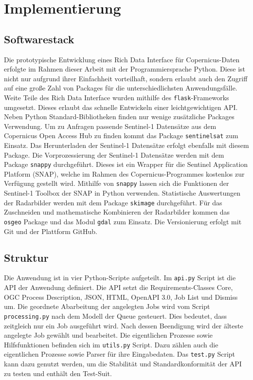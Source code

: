 \newpage
\restoregeometry
\section{Implementierung}
\subsection{Softwarestack}
Die prototypische Entwicklung eines Rich Data Interface für Copernicus-Daten erfolgte im Rahmen dieser Arbeit mit der Programmiersprache Python.
Diese ist nicht nur aufgrund ihrer Einfachheit vorteilhaft, sondern erlaubt auch den Zugriff auf eine große Zahl von Packages für die unterschiedlichsten 
Anwendungsfälle. Weite Teile des Rich Data Interface wurden mithilfe des \verb|flask|-Frameworks umgesetzt. Dieses erlaubt das schnelle Entwickeln einer leichtgewichtigen API.  
Neben Python Standard-Bibliotheken finden nur wenige zusätzliche Packages Verwendung. Um zu Anfragen passende Sentinel-1 Datensätze aus dem 
Copernicus Open Access Hub zu finden kommt das Package \verb|sentinelsat| zum Einsatz. Das Herunterladen der Sentinel-1 Datensätze erfolgt ebenfalls mit diesem Package. 
Die Vorprozessierung der Sentinel-1 Datensätze werden mit dem Package \verb|snappy| durchgeführt. 
Dieses ist ein Wrapper für die Sentinel Application Platform (SNAP), welche im Rahmen des Copernicus-Programmes kostenlos zur Verfügung 
gestellt wird. Mithilfe von \verb|snappy| lassen sich die Funktionen der Sentinel-1 Toolbox der SNAP in Python verwenden. 
Statistische Auswertungen der Radarbilder werden mit dem Package \verb|skimage| durchgeführt. 
Für das Zuschneiden und mathematische Kombinieren der Radarbilder kommen das \verb|osgeo| Package und das Modul \verb|gdal| zum Einsatz.
Die Versionierung erfolgt mit Git und der Plattform GitHub. 

\subsection{Struktur}
Die Anwendung ist in vier Python-Scripte aufgeteilt. Im \verb|api.py| Script ist die API der Anwendung definiert. 
Die API setzt die Requirements-Classes Core, OGC Process Description, JSON, HTML, OpenAPI 3.0, Job List und Dismiss um.
Die geordnete Abarbeitung der angelegten Jobs wird vom Script \verb|processing.py| nach dem Modell der Queue gesteuert. 
Dies bedeutet, dass zeitgleich nur ein Job ausgeführt wird. Nach dessen Beendigung wird der älteste angelegte Job gewählt und bearbeitet.
Die eigentlichen Prozesse sowie 
Hilfsfunktionen befinden sich im \verb|utils.py| Script. Dazu zählen auch die eigentlichen Prozesse sowie Parser für 
ihre Eingabedaten. Das \verb|test.py| Script kann dazu genutzt werden, um die Stabilität und Standardkonformität der API zu testen und enthält den Test-Suit.

